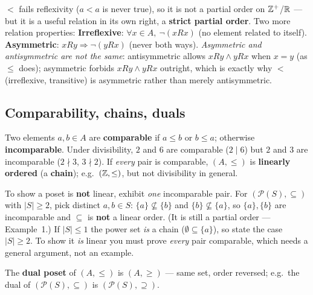\documentclass{fkt-notes}
\theoremstyle{definition}
\begin{document}
\begin{keybox}[title={Strict order: why $<$ is not a partial order}]
  $<$ fails reflexivity ($a<a$ is never true), so it is not a partial
  order on $\mathbb{Z}^+$/$\mathbb{R}$ --- but it is a useful relation in its own right,
  a \textbf{strict partial order}. Two more relation properties: \textbf{Irreflexive}: $\forall x\in A,\ \neg(xRx)$ (no
  element related to itself). \textbf{Asymmetric}: $xRy\Rightarrow
    \neg(yRx)$ (never both ways).
  \emph{Asymmetric and antisymmetric are not the same}: antisymmetric
  allows $xRy\wedge yRx$ when $x=y$ (as $\le$ does); asymmetric forbids
  $xRy\wedge yRx$ outright, which is exactly why $<$ (irreflexive,
  transitive) is asymmetric rather than merely antisymmetric.
\end{keybox}

\subsection{Comparability, chains, duals}
%
Two elements $a,b\in A$ are \textbf{comparable} if $a\le b$ or $b\le a$;
otherwise \textbf{incomparable}. Under divisibility, $2$ and $6$ are
comparable ($2\mid6$) but $2$ and $3$ are incomparable ($2\nmid3$,
$3\nmid2$). If \emph{every} pair is comparable, $(A,\le)$ is
\textbf{linearly ordered} (a \textbf{chain}); e.g.\ $(\mathbb{Z},\le)$, but not
divisibility in general.

\begin{rulebox}[title={Is it a linear order? Counterexample $\mathcal P(S)$}]
  To show a poset is \textbf{not} linear, exhibit \emph{one} incomparable
  pair. For $(\mathcal P(S),\subseteq)$ with $|S|\ge2$, pick distinct
  $a,b\in S$: $\{a\}\not\subseteq\{b\}$ and $\{b\}\not\subseteq\{a\}$, so
  $\{a\},\{b\}$ are incomparable and $\subseteq$ is \textbf{not} a linear
  order. (It is still a partial order --- Example~1.) If $|S|\le1$ the
  power set \emph{is} a chain ($\emptyset\subseteq\{a\}$), so state the
  case $|S|\ge2$. To show it \emph{is} linear you must prove \emph{every}
  pair comparable, which needs a general argument, not an example.
\end{rulebox}

The \textbf{dual poset} of $(A,\le)$ is $(A,\ge)$ --- same set, order
reversed; e.g.\ the dual of $(\mathcal P(S),\subseteq)$ is
$(\mathcal P(S),\supseteq)$.
\end{document}
